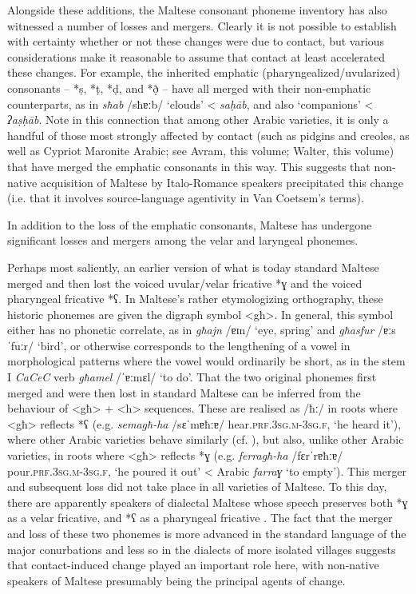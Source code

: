 \documentclass[output=paper]{langsci/langscibook}
\begin{document}
 \label{mergers}
Alongside these additions, the Maltese consonant phoneme inventory has also witnessed a number of losses and mergers. Clearly it is not possible to establish with certainty whether or not these changes were due to contact, but various considerations make it reasonable to assume that contact at least accelerated these changes. For example, the inherited emphatic (pharyngealized/uvularized) consonants -- *\d{s}, *\d{t}, *\d{d}, and *\d{ð} -- have all merged with their non-emphatic counterparts, as in \textit{sħab} /sħɐːb/ `clouds' < \textit{sa\d{h}\={a}b}, and also `companions' < \textit{ʔa\d{s}\d{h}\={a}b}. Note in this connection that among other Arabic varieties, it is only a handful of those most strongly affected by contact (such as pidgins and creoles, as well as Cypriot Maronite Arabic; see Avram, this volume; Walter, this volume) that have merged the emphatic consonants in this way. This suggests that non-native acquisition of Maltese by Italo-Romance speakers precipitated this change (i.e. that it involves source-language agentivity in Van Coetsem's \citeyear{VanCoetsem1988,VanCoetsem2000} terms).

In addition to the loss of the emphatic consonants, Maltese has undergone significant losses and mergers among the velar and laryngeal phonemes. 

Perhaps most saliently, an earlier version of what is today standard Maltese merged and then lost the voiced uvular/velar fricative *ɣ and the voiced pharyngeal fricative *ʕ. In Maltese's rather etymologizing orthography, these historic phonemes are given the digraph symbol <għ>. In general, this symbol either has no phonetic correlate, as in \textit{għajn} /ɐɪn/ `eye, spring' and \textit{għasfur} /ɐːsˈfuːr/ `bird', or otherwise corresponds to the lengthening of a vowel in morphological patterns where the vowel would ordinarily be short, as in the stem I \textit{CaCeC} verb \textit{għamel} /ˈɐːmɛl/ `to do'. That the two original phonemes first merged and were then lost in standard Maltese can be inferred from the behaviour of <għ> + <h> sequences. These are realised as /ħː/ in roots where <għ> reflects *ʕ (e.g. \textit{semagħ-ha} /sɛˈmɐħːɐ/ hear.\textsc{prf.3sg.m-3sg.f}, `he heard it'), where other Arabic varieties behave similarly (cf. \citealt[18] {Woidich2006}), but also, unlike other Arabic varieties, in roots where <għ> reflects *ɣ (e.g. \textit{ferragħ-ha} /fɛrˈrɐħːɐ/ pour.\textsc{prf.3sg.m-3sg.f}, `he poured it out' < Arabic \textit{farraɣ} `to empty'). This merger and subsequent loss did not take place in all varieties of Maltese. To this day, there are apparently speakers of dialectal Maltese whose speech preserves both *ɣ as a velar fricative, and *ʕ as a pharyngeal fricative \citep{klimiuk2017}. The fact that the merger and loss of these two phonemes is more advanced in the standard language of the major conurbations and less so in the dialects of more isolated villages suggests that contact-induced change played an important role here, with non-native speakers of Maltese presumably being the principal agents of change. 
\end{document}
